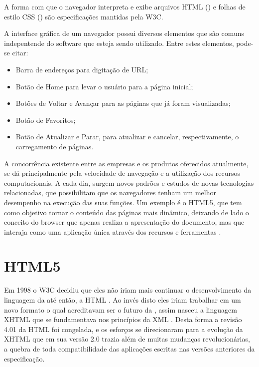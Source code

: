 \documentclass[espaco=simples,appendix=Name]{abnt}
\begin{document}
\begin{description}
A forma com que o navegador interpreta e exibe arquivos HTML () e folhas de estilo CSS () são especificações mantidas pela W3C.

A interface gráfica de um navegador possui diversos elementos que são comuns indepentende do software que esteja sendo utilizado. Entre estes elementos, pode-se citar: 
\begin{itemize}
	\item Barra de endereços para digitação de URL;
	\item Botão de Home para levar o usuário para a página inicial;
	\item Botões de Voltar e Avançar para as páginas que já foram visualizadas;
	\item Botão de Favoritos;
	\item Botão de Atualizar e Parar, para atualizar e cancelar, respectivamente, o carregamento de páginas.
\end{itemize}

A concorrência existente entre as empresas e os produtos oferecidos atualmente, se dá principalmente pela velocidade de navegação e a utilização dos recursos computacionais. A cada dia, surgem novos padrões e estudos de novas tecnologias relacionadas, que possibilitam que os navegadores tenham um melhor desempenho na execução das suas funções. Um exemplo é o HTML5, que tem como objetivo tornar o conteúdo das páginas mais dinâmico, deixando de lado o conceito do browser que apenas realiza a apresentação do documento, mas que interaja como uma aplicação única através dos recursos e ferramentas \cite{WebAppPlataform}.

\section{HTML5}

\item \noindent
Em 1998 o W3C decidiu que eles não iriam mais continuar o desenvolvimento da linguagem da  até então, a HTML . Ao invés disto eles iriam trabalhar em um novo formato o qual acreditavam ser o futuro da , assim nasceu a linguagem XHTML  que se fundamentava nos princípios da XML . Desta forma a revisão 4.01 da HTML foi congelada, e os esforços se direcionaram para a evolução da XHTML que em sua versão 2.0 trazia além de muitas mudanças revolucionárias, a quebra de toda compatibilidade das aplicações escritas nas versões anteriores da especificação.


\end{description}
\end{document}
